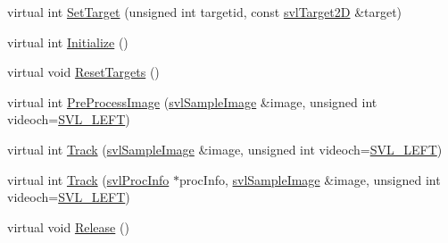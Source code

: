 \begin{DoxyCompactItemize}
virtual int \hyperlink{classsvl_tracker_m_s_brute_force_a9125651c10a859a3644eb270a14a7832}{Set\+Target} (unsigned int targetid, const \hyperlink{structsvl_target2_d}{svl\+Target2\+D} \&target)
\item 
virtual int \hyperlink{classsvl_tracker_m_s_brute_force_af4f2a1ebacfc6158d6ea17b41ceada2f}{Initialize} ()
\item 
virtual void \hyperlink{classsvl_tracker_m_s_brute_force_a3763e4631332c34d4d7408928e921932}{Reset\+Targets} ()
\item 
virtual int \hyperlink{classsvl_tracker_m_s_brute_force_aa252636897f247f1e27d35c4e32c6523}{Pre\+Process\+Image} (\hyperlink{classsvl_sample_image}{svl\+Sample\+Image} \&image, unsigned int videoch=\hyperlink{svl_definitions_8h_ab9fec7615f19c8df2919eebcab0b187f}{S\+V\+L\+\_\+\+L\+E\+F\+T})
\item 
virtual int \hyperlink{classsvl_tracker_m_s_brute_force_af693efc065120ce40c3f311a787c37bd}{Track} (\hyperlink{classsvl_sample_image}{svl\+Sample\+Image} \&image, unsigned int videoch=\hyperlink{svl_definitions_8h_ab9fec7615f19c8df2919eebcab0b187f}{S\+V\+L\+\_\+\+L\+E\+F\+T})
\item 
virtual int \hyperlink{classsvl_tracker_m_s_brute_force_acf680657566ae5e363d5d40922d50024}{Track} (\hyperlink{structsvl_proc_info}{svl\+Proc\+Info} $\ast$proc\+Info, \hyperlink{classsvl_sample_image}{svl\+Sample\+Image} \&image, unsigned int videoch=\hyperlink{svl_definitions_8h_ab9fec7615f19c8df2919eebcab0b187f}{S\+V\+L\+\_\+\+L\+E\+F\+T})
\item 
virtual void \hyperlink{classsvl_tracker_m_s_brute_force_a6e263ceb708413cc26709dbaae6700f8}{Release} ()
\end{DoxyCompactItemize}
